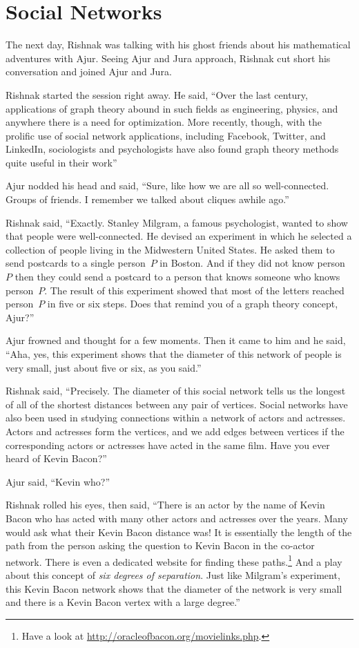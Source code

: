 \chapter{Social Networks}

The next day, Rishnak was talking with his ghost friends about his mathematical adventures with Ajur. Seeing Ajur and Jura approach, Rishnak cut short his conversation and joined Ajur and Jura.

Rishnak started the session right away. He said, ``Over the last century, applications of graph theory abound in such fields as engineering, physics, and anywhere there is a need for optimization. More recently, though, with the prolific use of social network applications, including Facebook, Twitter, and LinkedIn, sociologists and psychologists have also found graph theory methods quite useful in their work''

Ajur nodded his head and said, ``Sure, like how we are all so well-connected.  Groups of friends. I remember we talked about cliques awhile ago.''

Rishnak said, ``Exactly. Stanley Milgram, a famous psychologist, wanted to show that people were well-connected. He devised an experiment in which he selected a collection of people living in the Midwestern United States. He asked them to send postcards to a single person~$P$ in Boston. And if they did not know person~$P$ then they could send a postcard to a person that knows someone who knows person~$P$. The result of this experiment showed that most of the letters reached person~$P$ in five or six steps. Does that remind you of a graph theory concept, Ajur?''

Ajur frowned and thought for a few moments. Then it came to him and he said, ``Aha, yes, this experiment shows that the diameter of this network of people is very small, just about five or six, as you said.''

Rishnak said, ``Precisely. The diameter of this social network tells us the longest of all of the shortest distances between any pair of vertices. Social networks have also been used in studying connections within a network of actors and actresses. Actors and actresses form the vertices, and we add edges between vertices if the corresponding actors or actresses have acted in the same film. Have you ever heard of Kevin Bacon?'' 

Ajur said, ``Kevin who?''

Rishnak rolled his eyes, then said, ``There is an actor by the name of Kevin Bacon who has acted with many other actors and actresses over the years. Many would ask what their Kevin Bacon distance was! It is essentially the length of the path from the person asking the question to Kevin Bacon in the co-actor network. There is even a dedicated website for finding these paths.\footnote{Have a look at \url{http://oracleofbacon.org/movielinks.php}.} And a play about this concept of \textit{six degrees of separation}. Just like Milgram's experiment, this Kevin Bacon network shows that the diameter of the network is very small and there is a Kevin Bacon vertex with a large degree.''

